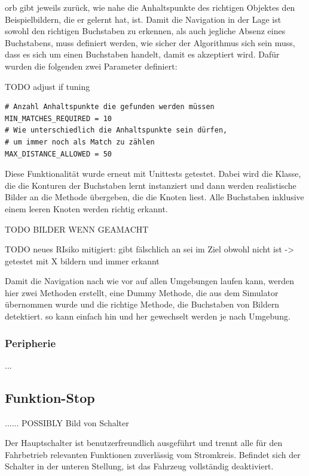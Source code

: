 \acrshort{orb} gibt jeweils zurück, wie nahe die Anhaltspunkte des richtigen Objektes den Beispielbildern, die er gelernt hat, ist. Damit die Navigation in der Lage ist sowohl den richtigen Buchstaben zu erkennen, als auch jegliche Absenz eines Buchstabens, muss definiert werden, wie sicher der Algorithmus sich sein muss, dass es sich um einen Buchstaben handelt, damit es akzeptiert wird. Dafür wurden die folgenden zwei Parameter definiert:

TODO adjust if tuning
\begin{verbatim}
# Anzahl Anhaltspunkte die gefunden werden müssen
MIN_MATCHES_REQUIRED = 10
# Wie unterschiedlich die Anhaltspunkte sein dürfen,
# um immer noch als Match zu zählen
MAX_DISTANCE_ALLOWED = 50
\end{verbatim}

Diese Funktionalität wurde erneut mit Unittests getestet.
Dabei wird die Klasse, die die Konturen der Buchstaben lernt instanziert und dann werden realistische Bilder an die Methode übergeben, die die Knoten liest. Alle Buchstaben inklusive einem leeren Knoten werden richtig erkannt.

TODO BILDER WENN GEAMACHT

TODO neues RIsiko mitigiert: gibt fälschlich an sei im Ziel obwohl nicht ist -> getestet mit X bildern und immer erkannt

Damit die Navigation nach wie vor auf allen Umgebungen laufen kann, werden hier zwei Methoden erstellt, eine Dummy Methode, die aus dem Simulator übernommen wurde und die richtige Methode, die Buchstaben von Bildern detektiert. so kann einfach hin und her gewechselt werden je nach Umgebung.

\subsubsection{Peripherie}

...


\newpage
\subsection{Funktion-Stop}

...... POSSIBLY Bild von Schalter

Der Hauptschalter ist benutzerfreundlich ausgeführt und trennt alle für den Fahrbetrieb relevanten Funktionen zuverlässig vom Stromkreis. Befindet sich der Schalter in der unteren Stellung, ist das Fahrzeug vollständig deaktiviert.

